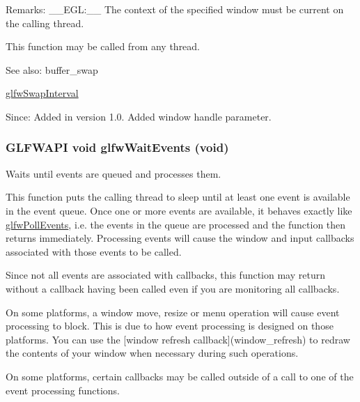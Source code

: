 \begin{Desc}
\item[Remarks:]\_\-\_\-EGL:\_\-\_\- The context of the specified window must be current on the calling thread.\end{Desc}
This function may be called from any thread.

\begin{Desc}
\item[See also:]buffer\_\-swap 

\hyperlink{group__context_g12a595c06947cec4967c6e1f14210a8a}{glfwSwapInterval}\end{Desc}
\begin{Desc}
\item[Since:]Added in version 1.0.  Added window handle parameter. \end{Desc}
\hypertarget{group__window_g6e042d05823c11e11c7339b81a237738}{
\subsubsection[glfwWaitEvents]{\setlength{\rightskip}{0pt plus 5cm}GLFWAPI void glfwWaitEvents (void)}}
\label{group__window_g6e042d05823c11e11c7339b81a237738}


Waits until events are queued and processes them. 

This function puts the calling thread to sleep until at least one event is available in the event queue. Once one or more events are available, it behaves exactly like \hyperlink{group__window_g872d16e4c77f58c0436f356255920cfc}{glfwPollEvents}, i.e. the events in the queue are processed and the function then returns immediately. Processing events will cause the window and input callbacks associated with those events to be called.

Since not all events are associated with callbacks, this function may return without a callback having been called even if you are monitoring all callbacks.

On some platforms, a window move, resize or menu operation will cause event processing to block. This is due to how event processing is designed on those platforms. You can use the \mbox{[}window refresh callback\mbox{]}(window\_\-refresh) to redraw the contents of your window when necessary during such operations.

On some platforms, certain callbacks may be called outside of a call to one of the event processing functions.

